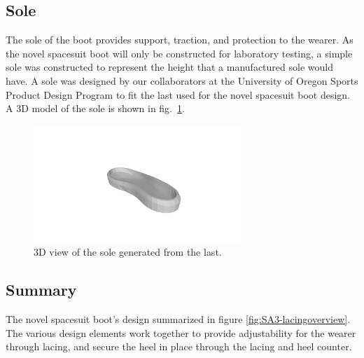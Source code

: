 \documentclass[defaultstyle,11pt]{thesis}
\begin{document}
\hypertarget{sole-1}{%
\subsection{Sole}\label{sole-1}}

The sole of the boot provides support, traction, and protection to the wearer.
As the novel spacesuit boot will only be constructed for laboratory testing, a simple sole was constructed to represent the height that a manufactured sole would have.
A sole was designed by our collaborators at the University of Oregon Sports Product Design Program to fit the last used for the novel spacesuit boot design.
A 3D model of the sole is shown in fig.~\ref{fig:SA3-solemold}.

\begin{figure}
\hypertarget{fig:SA3-solemold}{%
\centering
\includegraphics[width=0.7\textwidth,height=\textheight]{../fig/SA3/sole_3d.png}
\caption{3D view of the sole generated from the last.}\label{fig:SA3-solemold}
}
\end{figure}

\hypertarget{summary-4}{%
\subsection{Summary}\label{summary-4}}

The novel spacesuit boot's design summarized in figure \ref{fig:SA3-lacingoverview}.
The various design elements work together to provide adjustability for the wearer through lacing, and secure the heel in place through the lacing and heel counter.
\end{document}

